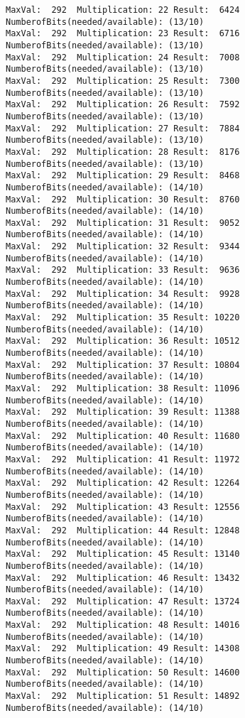 \documentclass{article}
\begin{document}
\begin{Verbatim}[commandchars=\\\{\}]
MaxVal:  292  Multiplication: 22 Result:  6424 NumberofBits(needed/available): (13/10)
MaxVal:  292  Multiplication: 23 Result:  6716 NumberofBits(needed/available): (13/10)
MaxVal:  292  Multiplication: 24 Result:  7008 NumberofBits(needed/available): (13/10)
MaxVal:  292  Multiplication: 25 Result:  7300 NumberofBits(needed/available): (13/10)
MaxVal:  292  Multiplication: 26 Result:  7592 NumberofBits(needed/available): (13/10)
MaxVal:  292  Multiplication: 27 Result:  7884 NumberofBits(needed/available): (13/10)
MaxVal:  292  Multiplication: 28 Result:  8176 NumberofBits(needed/available): (13/10)
MaxVal:  292  Multiplication: 29 Result:  8468 NumberofBits(needed/available): (14/10)
MaxVal:  292  Multiplication: 30 Result:  8760 NumberofBits(needed/available): (14/10)
MaxVal:  292  Multiplication: 31 Result:  9052 NumberofBits(needed/available): (14/10)
MaxVal:  292  Multiplication: 32 Result:  9344 NumberofBits(needed/available): (14/10)
MaxVal:  292  Multiplication: 33 Result:  9636 NumberofBits(needed/available): (14/10)
MaxVal:  292  Multiplication: 34 Result:  9928 NumberofBits(needed/available): (14/10)
MaxVal:  292  Multiplication: 35 Result: 10220 NumberofBits(needed/available): (14/10)
MaxVal:  292  Multiplication: 36 Result: 10512 NumberofBits(needed/available): (14/10)
MaxVal:  292  Multiplication: 37 Result: 10804 NumberofBits(needed/available): (14/10)
MaxVal:  292  Multiplication: 38 Result: 11096 NumberofBits(needed/available): (14/10)
MaxVal:  292  Multiplication: 39 Result: 11388 NumberofBits(needed/available): (14/10)
MaxVal:  292  Multiplication: 40 Result: 11680 NumberofBits(needed/available): (14/10)
MaxVal:  292  Multiplication: 41 Result: 11972 NumberofBits(needed/available): (14/10)
MaxVal:  292  Multiplication: 42 Result: 12264 NumberofBits(needed/available): (14/10)
MaxVal:  292  Multiplication: 43 Result: 12556 NumberofBits(needed/available): (14/10)
MaxVal:  292  Multiplication: 44 Result: 12848 NumberofBits(needed/available): (14/10)
MaxVal:  292  Multiplication: 45 Result: 13140 NumberofBits(needed/available): (14/10)
MaxVal:  292  Multiplication: 46 Result: 13432 NumberofBits(needed/available): (14/10)
MaxVal:  292  Multiplication: 47 Result: 13724 NumberofBits(needed/available): (14/10)
MaxVal:  292  Multiplication: 48 Result: 14016 NumberofBits(needed/available): (14/10)
MaxVal:  292  Multiplication: 49 Result: 14308 NumberofBits(needed/available): (14/10)
MaxVal:  292  Multiplication: 50 Result: 14600 NumberofBits(needed/available): (14/10)
MaxVal:  292  Multiplication: 51 Result: 14892 NumberofBits(needed/available): (14/10)

\end{Verbatim}
\end{document}
